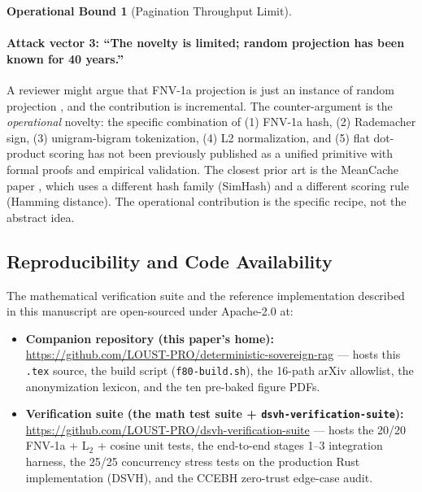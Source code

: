 \documentclass[10pt,twocolumn]{article}
\theoremstyle{definition}
\newtheorem{operationalbound}[theorem]{Operational Bound}
\theoremstyle{remark}
\begin{document}
\begin{operationalbound}[Pagination Throughput Limit]
\paragraph{Attack vector 3: ``The novelty is limited; random projection has been known for 40 years.''}
A reviewer might argue that FNV-1a projection is just an instance of
random projection \citep{kane2013jl, ghojogh2021jl}, and the
contribution is incremental. The counter-argument is the
\emph{operational} novelty: the specific combination of (1) FNV-1a
hash, (2) Rademacher sign, (3) unigram-bigram tokenization, (4) L2
normalization, and (5) flat dot-product scoring has not been
previously published as a unified primitive with formal proofs and
empirical validation. The closest prior art is the MeanCache paper
\citep{meancache2024}, which uses a different hash family (SimHash)
and a different scoring rule (Hamming distance). The operational
contribution is the specific recipe, not the abstract idea.

\subsection{Reproducibility and Code Availability}
\label{sec:reproducibility}

The mathematical verification suite and the reference implementation
described in this manuscript are open-sourced under Apache-2.0 at:

\begin{itemize}
\item \textbf{Companion repository (this paper's home):}
  \url{https://github.com/LOUST-PRO/deterministic-sovereign-rag}
  --- hosts this \texttt{.tex} source, the build script
  (\texttt{f80-build.sh}), the 16-path arXiv allowlist, the
  anonymization lexicon, and the ten pre-baked figure PDFs.
\item \textbf{Verification suite (the math test suite +
  \texttt{dsvh-verification-suite}):}
  \url{https://github.com/LOUST-PRO/dsvh-verification-suite}
  --- hosts the 20/20 FNV-1a + L$_2$ + cosine unit tests, the
  end-to-end stages 1--3 integration harness, the 25/25 concurrency
  stress tests on the production Rust implementation (DSVH), and the
  CCEBH zero-trust edge-case audit.
\end{itemize}


\end{operationalbound}
\end{document}
